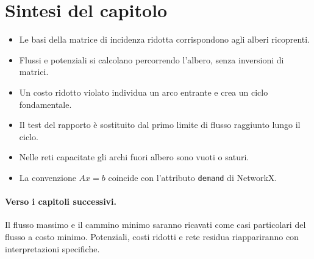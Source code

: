 \documentclass[11pt,a4paper]{article}
\begin{document}
\section{Sintesi del capitolo}
\begin{learningbox}
\begin{itemize}[nosep]
\item Le basi della matrice di incidenza ridotta corrispondono agli alberi ricoprenti.
\item Flussi e potenziali si calcolano percorrendo l'albero, senza inversioni di matrici.
\item Un costo ridotto violato individua un arco entrante e crea un ciclo fondamentale.
\item Il test del rapporto è sostituito dal primo limite di flusso raggiunto lungo il ciclo.
\item Nelle reti capacitate gli archi fuori albero sono vuoti o saturi.
\item La convenzione $Ax=b$ coincide con l'attributo \texttt{demand} di NetworkX.
\end{itemize}
\end{learningbox}

\paragraph{Verso i capitoli successivi.}
Il flusso massimo e il cammino minimo saranno ricavati come casi particolari del flusso a costo minimo. Potenziali, costi ridotti e rete residua riappariranno con interpretazioni specifiche.
\end{document}
